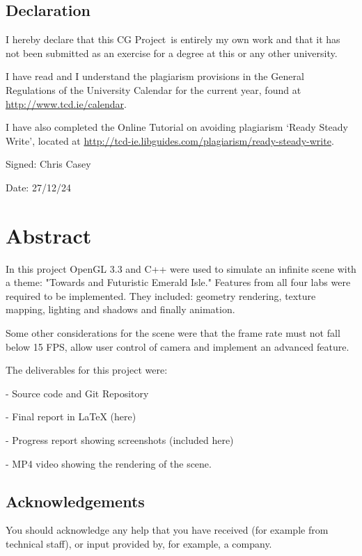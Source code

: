 \documentclass[a4paper,oneside,12pt]{book}
\title{\thesistitle}
\author{\authorname}
\newcommand{\typeofthesis}{CG Project} %
\begin{document}

\doublespacing

\section*{Declaration}
I hereby declare that this \typeofthesis\ is entirely my own work and that it has not been submitted as an exercise for a degree at this or any other university.

I have read and I understand the plagiarism provisions in the General Regulations of the University Calendar for the current year, found at \url{http://www.tcd.ie/calendar}.

I have also completed the Online Tutorial on avoiding plagiarism `Ready Steady Write', located at \url{http://tcd-ie.libguides.com/plagiarism/ready-steady-write}.
\vspace{1cm}

Signed:     Chris Casey

Date:       27/12/24


\newpage
\chapter{Abstract}

In this project OpenGL 3.3 and C++ were used to simulate an infinite scene with a theme: "Towards and Futuristic Emerald Isle." Features from all four labs were required to be implemented. They included: geometry rendering, texture mapping, lighting and shadows and finally animation. 


Some other considerations for the scene were that the frame rate must not fall below 15 FPS, allow user control of camera and implement an advanced feature.


The deliverables for this project were: 

    - Source code and Git Repository

    - Final report in LaTeX (here)

    - Progress report showing screenshots (included here)

    - MP4 video showing the rendering of the scene.

\newpage
\raggedright %


\newpage




\mainmatter

%
%


%
%
%
%
\newpage
\section*{\Huge{Acknowledgements}}


You should acknowledge any help that you have received (for example from technical staff), or input provided by, for example, a company.
\newpage \tableofcontents
\renewcommand{\thechapter}{A\arabic{chapter}}
%
\end{document}
